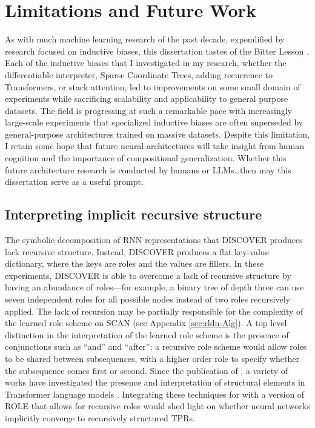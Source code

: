 \section{Limitations and Future Work}

As with much machine learning research of the past decade, expemlified by research focused on inductive biases, this dissertation tastes of the Bitter Lesson \citep{Sutton2019BitterLesson}. Each of the inductive biases that I investigated in my research, whether the differentiable interpreter, Sparse Coordinate Trees, adding recurrence to Transformers, or stack attention, led to improvements on some small domain of experiments while sacrificing scalability and applicability to general purpose datasets. The field is progressing at such a remarkable pace with increasingly large-scale experiments that specialized inductive biases are often superseded by general-purpose architectures trained on massive datasets. Despite this limitation, I retain some hope that future neural architectures will take insight from human cognition and the importance of compositional generalization. Whether this future architecture research is conducted by humans or LLMs\ldots then may this dissertation serve as a useful prompt.

\subsection{Interpreting implicit recursive structure}
The symbolic decomposition of RNN representations that DISCOVER produces lack recursive structure. Instead, DISCOVER produces a flat key-value dictionary, where the keys are roles and the values are fillers. In these experiments, DISCOVER is able to overcome a lack of recursive structure by having an abundance of roles—for example, a binary tree of depth three can use seven independent roles for all possible nodes instead of two roles recursively applied. The lack of recursion may be partially responsible for the complexity of the learned role scheme on SCAN (see Appendix \ref{sec:rldn-Alg}). A top level distinction in the interpretation of the learned role scheme is the presence of conjunctions such as ``and'' and ``after''; a recursive role scheme would allow roles to be shared between subsequences, with a higher order role to specify whether the subsequence comes first or second. Since the publication of \citet{soulos2019discovering}, a variety of works have investigated the presence and interpretation of structural elements in Transformer language models \citep{hewitt2019structural,murty2022characterizing,murty2023grokking}. Integrating these techniques for with a version of ROLE that allows for recursive roles would shed light on whether neural networks implicitly converge to recursively structured TPRs.

